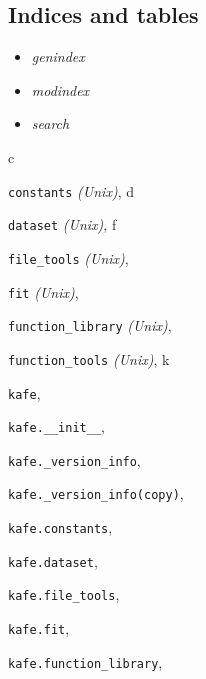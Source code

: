 \documentclass[a4paper,10pt,english]{sphinxmanual}
\begin{document}
\subsection{Indices and tables}
\label{index:indices-and-tables}\begin{itemize}
\item {} 
\emph{genindex}

\item {} 
\emph{modindex}

\item {} 
\emph{search}

\end{itemize}


\renewcommand{\indexname}{Python Module Index}
\begin{theindex}
\def\bigletter#1{{\Large\sffamily#1}\nopagebreak\vspace{1mm}}
\bigletter{c}
\item {\texttt{constants}} \emph{(Unix)}, \pageref{index:module-constants}
\indexspace
\bigletter{d}
\item {\texttt{dataset}} \emph{(Unix)}, \pageref{index:module-dataset}
\indexspace
\bigletter{f}
\item {\texttt{file\_tools}} \emph{(Unix)}, \pageref{index:module-file_tools}
\item {\texttt{fit}} \emph{(Unix)}, \pageref{index:module-fit}
\item {\texttt{function\_library}} \emph{(Unix)}, \pageref{index:module-function_library}
\item {\texttt{function\_tools}} \emph{(Unix)}, \pageref{index:module-function_tools}
\indexspace
\bigletter{k}
\item {\texttt{kafe}}, \pageref{index:module-kafe}
\item {\texttt{kafe.\_\_init\_\_}}, \pageref{index:module-kafe.__init__}
\item {\texttt{kafe.\_version\_info}}, \pageref{index:module-kafe._version_info}
\item {\texttt{kafe.\_version\_info(copy)}}, \pageref{index:module-kafe._version_info(copy)}
\item {\texttt{kafe.constants}}, \pageref{index:module-kafe.constants}
\item {\texttt{kafe.dataset}}, \pageref{index:module-kafe.dataset}
\item {\texttt{kafe.file\_tools}}, \pageref{index:module-kafe.file_tools}
\item {\texttt{kafe.fit}}, \pageref{index:module-kafe.fit}
\item {\texttt{kafe.function\_library}}, \pageref{index:module-kafe.function_library}

\end{theindex}
\end{document}
